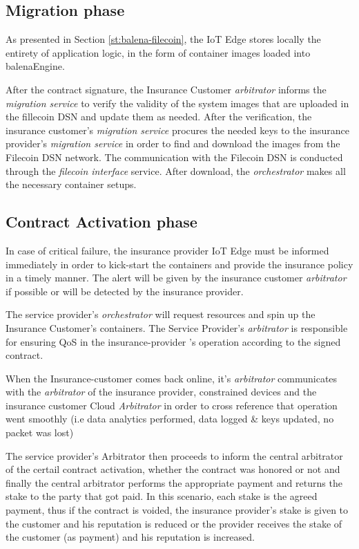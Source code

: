 \subsection{Migration phase}
As presented in Section \ref{st:balena-filecoin}, the IoT Edge stores locally the entirety of application logic, in the form of container images loaded into balenaEngine.

After the contract signature, the Insurance Customer \textit{arbitrator} informs the \textit{migration service} to verify the validity of the system images that are uploaded in the fillecoin DSN and update them as needed. After the verification, the insurance customer’s \textit{migration service} procures the needed keys to the insurance provider’s \textit{migration service} in order to find and download the images from the Filecoin DSN network. The communication with the Filecoin DSN is conducted through the \textit{filecoin interface} service. After download, the \textit{orchestrator} makes all the necessary container setups. 

\subsection{Contract Activation phase}
In case of critical failure, the insurance provider IoT Edge must be informed immediately in order to kick-start the containers and provide the insurance policy in a timely manner. The alert will be given by the insurance customer \textit{arbitrator} if possible or will be detected by the insurance provider.
 
The service provider's \textit{orchestrator} will request resources and spin up the Insurance Customer’s containers. The Service Provider’s \textit{arbitrator} is responsible for ensuring QoS in the insurance-provider  ’s operation according to the signed contract.
 
When the Insurance-customer comes back online, it’s \textit{arbitrator} communicates with the \textit{arbitrator} of the insurance provider, constrained devices and the insurance customer Cloud \textit{Arbitrator} in order to cross reference that operation went smoothly (i.e data analytics performed, data logged \& keys updated, no packet was lost)
 
The service provider's Arbitrator then proceeds to inform the central arbitrator of the certail contract activation, whether the contract was honored or not and finally the central arbitrator performs the appropriate payment and returns the stake to the party that got paid. In this scenario, each stake is the agreed payment, thus if the contract is voided, the insurance provider’s stake is given to the customer and his reputation is reduced or the provider receives the stake of the customer (as payment) and his reputation is increased.


